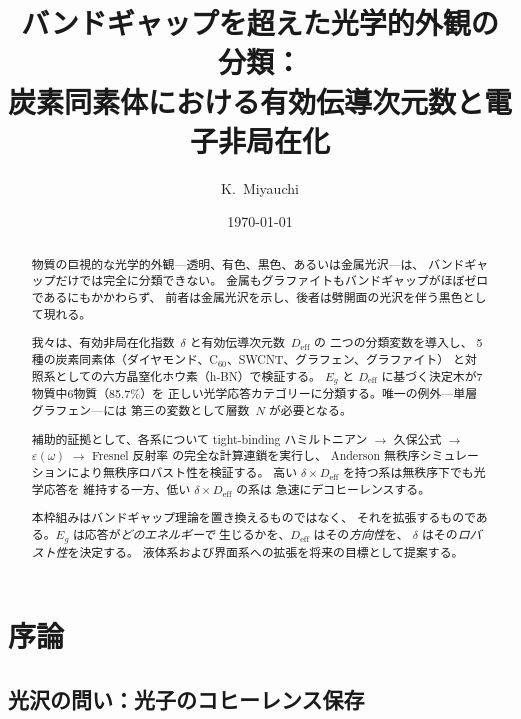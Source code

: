 \documentclass[twocolumn,showpacs,preprintnumbers,amsmath,amssymb,prb]{revtex4-2}
\begin{document}

\title{バンドギャップを超えた光学的外観の分類：\\
炭素同素体における有効伝導次元数と電子非局在化}

\author{K.~Miyauchi}

\date{\today}

\begin{abstract}
物質の巨視的な光学的外観---透明、有色、黒色、あるいは金属光沢---は、
バンドギャップだけでは完全に分類できない。
金属もグラファイトもバンドギャップがほぼゼロであるにもかかわらず、
前者は金属光沢を示し、後者は劈開面の光沢を伴う黒色として現れる。

我々は、有効非局在化指数~$\delta$ と有効伝導次元数~$D_\mathrm{eff}$ の
二つの分類変数を導入し、
5種の炭素同素体（ダイヤモンド、C$_{60}$、SWCNT、グラフェン、グラファイト）
と対照系としての六方晶窒化ホウ素（h-BN）で検証する。
$E_g$ と $D_\mathrm{eff}$ に基づく決定木が7物質中6物質（85.7\%）を
正しい光学応答カテゴリーに分類する。唯一の例外---単層グラフェン---には
第三の変数として層数~$N$ が必要となる。

補助的証拠として、各系について tight-binding ハミルトニアン $\to$
久保公式 $\to$ $\varepsilon(\omega)$ $\to$ Fresnel 反射率
の完全な計算連鎖を実行し、
Anderson 無秩序シミュレーションにより無秩序ロバスト性を検証する。
高い $\delta \times D_\mathrm{eff}$ を持つ系は無秩序下でも光学応答を
維持する一方、低い $\delta \times D_\mathrm{eff}$ の系は
急速にデコヒーレンスする。

本枠組みはバンドギャップ理論を置き換えるものではなく、
それを拡張するものである。$E_g$ は応答が\emph{どのエネルギーで}
生じるかを、$D_\mathrm{eff}$ はその\emph{方向性}を、
$\delta$ はその\emph{ロバスト性}を決定する。
液体系および界面系への拡張を将来の目標として提案する。
\end{abstract}

\maketitle

\section{序論}

\subsection{光沢の問い：光子のコヒーレンス保存}
\end{document}

